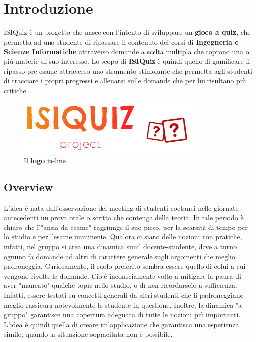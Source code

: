 

\chapter{Introduzione}
ISIQuiz è un progetto che nasce con l'intento di sviluppare un \textbf{gioco a quiz}, che permetta ad uno studente di ripassare il contenuto dei corsi di \textbf{Ingegneria e Scienze Informatiche} attraverso domande a scelta multipla che coprono una o più materie di suo interesse. Lo scopo di \textbf{ISIQuiz} è quindi quello di gamificare il ripasso pre-esame attraverso uno strumento stimolante che permetta agli studenti di tracciare i propri progressi e allenarsi sulle domande che per lui risultano più critiche.
\begin{figure}[H]
    \caption{Il \textbf{logo} in-line}
    \label{fig:Logo}
    \centering
    \includegraphics[width=0.8\textwidth]{Extra/ISIQuizLogoLineTransparent.png}
\end{figure}

\section{Overview}
L'idea è nata dall'osservazione dei meeting di studenti coetanei nelle giornate antecedenti un prova orale o scritta che contenga della teoria. In tale periodo è chiaro che l'"ansia da esame" raggiunge il suo picco, per la scarsità di tempo per lo studio e per l'esame imminente. Qualora ci siano delle nozioni non pratiche, infatti, nel gruppo si crea una dinamica simil docente-studente, dove a turno ognuno fa domande ad altri di carattere generale sugli argomenti che meglio padroneggia. Curiosamente, il ruolo preferito sembra essere quello di colui a cui vengono rivolte le domande. Ciò è inconsciamente volto a mitigare la paura di aver "mancato" qualche topic nello studio, o di non ricordarselo a sufficienza. Infatti, essere testati su concetti generali da altri studenti che li padroneggiano meglio rassicura notevolmente lo studente in questione. Inoltre, la dinamica "a gruppo" garantisce una copertura adeguata di tutte le nozioni più importanti. L'idea è quindi quella di creare un'applicazione che garantisca una esperienza simile, quando la situazione sopracitata non è possibile. 


